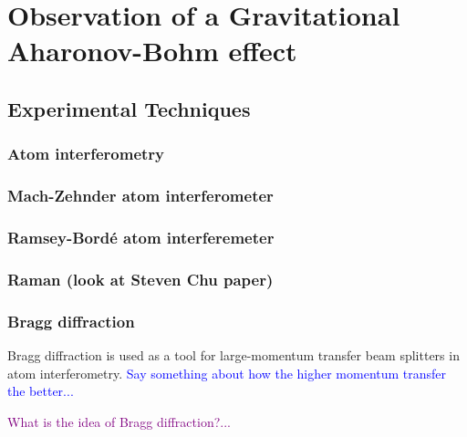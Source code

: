 \documentclass[reprint,
nofootinbib,
amsmath,amssymb,
aps]{revtex4-1}
\begin{document}
\section{Observation of a Gravitational Aharonov-Bohm effect} \label{sect:2}






\subsection{Experimental Techniques}









\subsubsection{Atom interferometry}


\subsubsection{Mach-Zehnder atom interferometer}

\subsubsection{Ramsey-Bord\'{e} atom interferemeter}



\subsubsection{Raman (look at Steven Chu paper)}

\subsubsection{Bragg diffraction}

Bragg diffraction is used as a tool for large-momentum transfer beam splitters in atom interferometry. \textcolor{blue}{Say something about how the higher momentum transfer the better...}  


\textcolor{purple}{What is the idea of Bragg diffraction?...}
\end{document}
